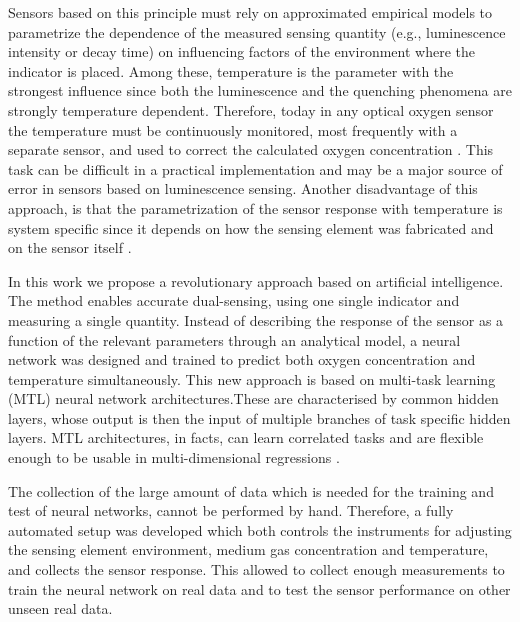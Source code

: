 \documentclass[9pt,twocolumn,twoside,pdftex]{optica}
\begin{document}
Sensors based on this principle must rely on approximated empirical models to parametrize the dependence of the measured sensing quantity (e.g., luminescence intensity or decay time) on influencing factors of the environment where the indicator is placed. Among these, temperature is the parameter with the strongest influence since both the luminescence and the quenching phenomena are strongly temperature dependent. Therefore, today in any optical oxygen sensor the temperature must be continuously monitored, most frequently with a separate sensor, and used to correct the calculated oxygen concentration \cite{Li2015}. This task can be difficult in a practical implementation and may be a major source of error in sensors based on luminescence sensing. Another disadvantage of this approach, is that the parametrization of the sensor response with temperature is system specific since it depends  on how the sensing element was fabricated and on the sensor itself \cite{Xu1994,Draxler1995,Hartmann1996,Mills1998,Badocco2008,Dini2011}.

In this work we propose a revolutionary approach based on artificial intelligence. The method enables accurate dual-sensing, using one single indicator and measuring a single quantity.
Instead of describing the response of the sensor as a function of the relevant parameters through an analytical model, a neural network  was designed and trained to predict both oxygen concentration and temperature simultaneously.
This new approach is based on multi-task learning (MTL) neural network architectures.These are characterised by common hidden layers, whose output is then the input of multiple branches of task specific hidden layers. MTL architectures, in facts, can learn correlated tasks \cite{Thrun1996, Caruana1997, Zhang2017, Baxter2000, Thung2018} and are flexible enough to be usable in multi-dimensional regressions \cite{Michelucci2019_2}.

The collection of the large amount of data which is needed for the training and test of neural networks, cannot be performed by hand. Therefore, a fully automated setup was developed which both controls the instruments for adjusting the sensing element environment, medium gas concentration and temperature, and collects the sensor response. This allowed to collect enough measurements to train the neural network on real data and to test the sensor performance on other unseen real data.
\end{document}
